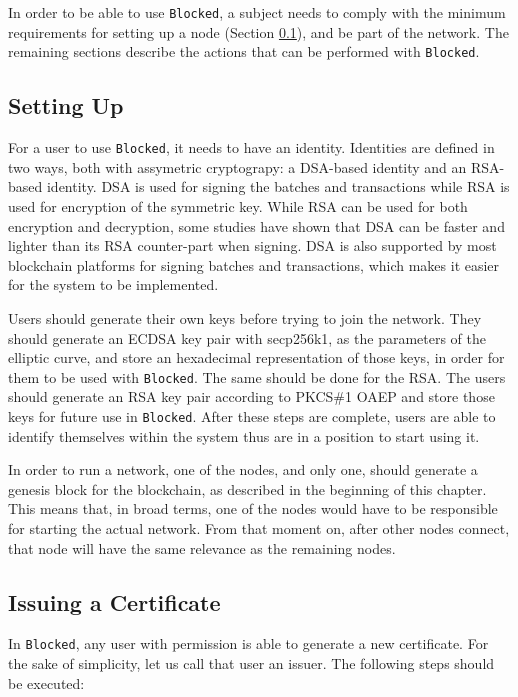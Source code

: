 In order to be able to use \texttt{Blocked}, a subject needs to comply with the minimum requirements for setting up a node (Section \ref{sec:design-setup}), and be part of the network. The remaining sections describe the actions that can be performed with \texttt{Blocked}.

\subsection{Setting Up}
\label{sec:design-setup}

For a user to use \texttt{Blocked}, it needs to have an identity. Identities are defined in two ways, both with assymetric cryptograpy: a DSA-based identity and an RSA-based identity. DSA is used for signing the batches and transactions while RSA is used for encryption of the symmetric key. While RSA can be used for both encryption and decryption, some studies have shown that DSA can be faster and lighter than its RSA counter-part when signing. DSA is also supported by most blockchain platforms for signing batches and transactions, which makes it easier for the system to be implemented.

Users should generate their own keys before trying to join the network. They should generate an ECDSA key pair with secp256k1, as the parameters of the elliptic curve, and store an hexadecimal representation of those keys, in order for them to be used with \texttt{Blocked}. The same should be done for the RSA. The users should generate an RSA key pair according to PKCS\#1 OAEP and store those keys for future use in \texttt{Blocked}. After these steps are complete, users are able to identify themselves within the system thus are in a position to start using it.

In order to run a network, one of the nodes, and only one, should generate a genesis block for the blockchain, as described in the beginning of this chapter. This means that, in broad terms, one of the nodes would have to be responsible for starting the actual network. From that moment on, after other nodes connect, that node will have the same relevance as the remaining nodes.

\subsection{Issuing a Certificate}

In \texttt{Blocked}, any user with permission is able to generate a new certificate. For the sake of simplicity, let us call that user an issuer. The following steps should be executed:


